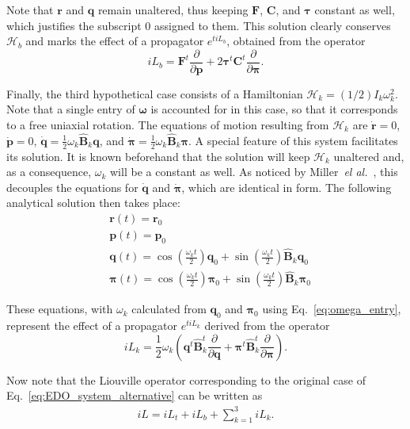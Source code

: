 \documentclass[aip,jcp,reprint,amsmath,amssymb,amsfont]{revtex4-1}
\newcommand{\mt}[1]{\boldsymbol{\mathbf{#1}}}           %
\newcommand{\vt}[1]{\boldsymbol{\mathbf{#1}}}           %
\newcommand{\tr}[1]{#1^t}                               %
\newcommand{\diff}[2]{\dfrac{\partial #1}{\partial #2}} %
\begin{document}
Note that $\vt r$ and $\vt q$ remain unaltered, thus keeping $\vt F$, $\mt C$, and $\vt \tau$ constant as well, which justifies the subscript $0$ assigned to them. This solution clearly conserves $\mathcal{H}_b$ and marks the effect of a propagator $e^{t i\!L_b}$, obtained from the operator
\[
i\!L_b = \tr{\vt F} \diff{}{\vt p} + 2 \tr{\vt \tau} \tr{\mt C} \diff{}{\vt \pi}.
\]

Finally, the third hypothetical case consists of a Hamiltonian $\mathcal{H}_k = (1/2) I_k \omega_k^2$. Note that a single entry of $\vt \omega$ is accounted for in this case, so that it corresponds to a free uniaxial rotation. The equations of motion resulting from $\mathcal{H}_k$ are $\dot{\vt r} = 0$, $\dot{\vt p} = 0$, $\dot{\vt q} = \frac{1}{2} \omega_k \hat{\mt B}_k \vt q$, and $\dot{\vt \pi} = \frac{1}{2} \omega_k \hat{\mt B}_k \vt \pi$. A special feature of this system facilitates its solution. It is known beforehand that the solution will keep $\mathcal{H}_k$ unaltered and, as a consequence, $\omega_k$ will be a constant as well. As noticed by Miller~\textit{el al.}~\cite{Miller2002}, this decouples the equations for $\dot{\vt q}$ and $\dot{\vt \pi}$, which are identical in form. The following analytical solution then takes place:\cite{Miller2002}
\begin{align*}
&{\vt r}(t) = {\vt r}_0 \\
&{\vt p}(t) = {\vt p}_0 \\
&{\vt q}(t) = \cos\left(\frac{\omega_k t}{2}\right) \vt q_0 + \sin\left(\frac{\omega_k t}{2}\right) \hat{\mt B}_k \vt q_0 \\
&{\vt \pi}(t) = \cos\left(\frac{\omega_k t}{2}\right) \vt \pi_0 + \sin\left(\frac{\omega_k t}{2}\right) \hat{\mt B}_k \vt \pi_0
\end{align*}

These equations, with $\omega_k$ calculated from $\vt q_0$ and $\vt \pi_0$ using Eq.~\ref{eq:omega_entry}, represent the effect of a propagator $e^{t i\!L_k}$ derived from the operator
\[
i\!L_k = \frac{1}{2} \omega_k \left( \tr{\vt q}\tr{\hat{\mt B}_k} \diff{}{\vt q} + \tr{\vt \pi}\tr{\hat{\mt B}_k} \diff{}{\vt \pi} \right).
\]

Now note that the Liouville operator corresponding to the original case of Eq.~\ref{eq:EDO_system_alternative} can be written as
\begin{align}
\label{eq:full_operator}
i\!L = i\!L_t + i\!L_b + \sum_{k=1}^3 i\!L_k.
\end{align}
\end{document}
